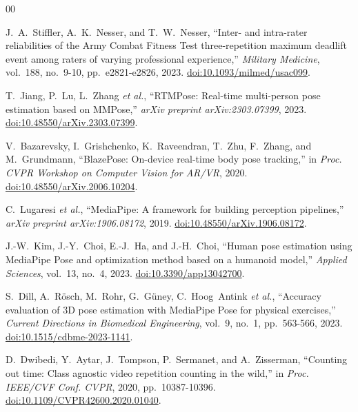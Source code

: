 \documentclass[conference]{IEEEtran}
\begin{document}
\begin{thebibliography}{00}

J.~A.~Stiffler, A.~K.~Nesser, and T.~W.~Nesser, ``Inter- and intra-rater reliabilities of the Army Combat Fitness Test three-repetition maximum deadlift event among raters of varying professional experience,'' \textit{Military Medicine}, vol.~188, no.~9-10, pp.~e2821-e2826, 2023. \href{https://doi.org/10.1093/milmed/usac099}{doi:10.1093/milmed/usac099}.

T.~Jiang, P.~Lu, L.~Zhang \textit{et al.}, ``RTMPose: Real-time multi-person pose estimation based on MMPose,'' \textit{arXiv preprint arXiv:2303.07399}, 2023. \href{https://doi.org/10.48550/arXiv.2303.07399}{doi:10.48550/arXiv.2303.07399}.

V.~Bazarevsky, I.~Grishchenko, K.~Raveendran, T.~Zhu, F.~Zhang, and M.~Grundmann, ``BlazePose: On-device real-time body pose tracking,'' in \textit{Proc. CVPR Workshop on Computer Vision for AR/VR}, 2020. \href{https://doi.org/10.48550/arXiv.2006.10204}{doi:10.48550/arXiv.2006.10204}.

C.~Lugaresi \textit{et al.}, ``MediaPipe: A framework for building perception pipelines,'' \textit{arXiv preprint arXiv:1906.08172}, 2019. \href{https://doi.org/10.48550/arXiv.1906.08172}{doi:10.48550/arXiv.1906.08172}.

J.-W.~Kim, J.-Y.~Choi, E.-J.~Ha, and J.-H.~Choi, ``Human pose estimation using MediaPipe Pose and optimization method based on a humanoid model,'' \textit{Applied Sciences}, vol.~13, no.~4, 2023. \href{https://doi.org/10.3390/app13042700}{doi:10.3390/app13042700}.

S.~Dill, A.~R\"{o}sch, M.~Rohr, G.~G\"{u}ney, C.~Hoog~Antink \textit{et al.}, ``Accuracy evaluation of 3D pose estimation with MediaPipe Pose for physical exercises,'' \textit{Current Directions in Biomedical Engineering}, vol.~9, no.~1, pp.~563-566, 2023. \href{https://doi.org/10.1515/cdbme-2023-1141}{doi:10.1515/cdbme-2023-1141}.

D.~Dwibedi, Y.~Aytar, J.~Tompson, P.~Sermanet, and A.~Zisserman, ``Counting out time: Class agnostic video repetition counting in the wild,'' in \textit{Proc. IEEE/CVF Conf. CVPR}, 2020, pp.~10387-10396. \href{https://doi.org/10.1109/CVPR42600.2020.01040}{doi:10.1109/CVPR42600.2020.01040}.


\end{thebibliography}
\end{document}
